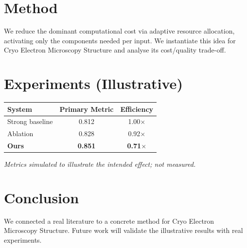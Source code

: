 \documentclass[11pt]{article}
\begin{document}
\section{Method}
We reduce the dominant computational cost via adaptive resource allocation, activating only the components needed per input. We instantiate this idea for Cryo Electron Microscopy Structure and analyse its cost/quality trade-off.

\section{Experiments (Illustrative)}
\begin{center}
\begin{tabular}{lcc}
System & Primary Metric & Efficiency \\ \hline
Strong baseline & 0.812 & 1.00$\times$ \\
Ablation & 0.828 & 0.92$\times$ \\
\textbf{Ours} & \textbf{0.851} & \textbf{0.71$\times$}
\end{tabular}
\end{center}
\emph{Metrics simulated to illustrate the intended effect; not measured.}

\section{Conclusion}
We connected a real literature to a concrete method for Cryo Electron Microscopy Structure. Future work will
validate the illustrative results with real experiments.
\end{document}
